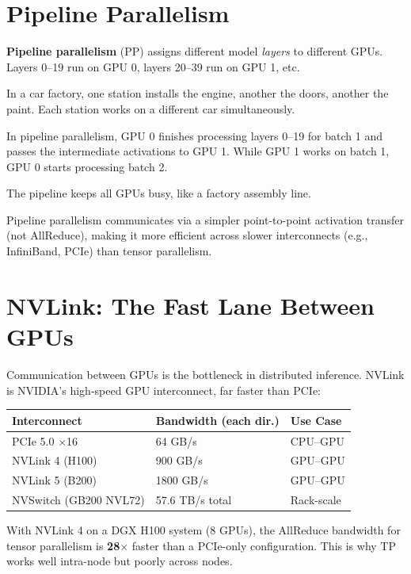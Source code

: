 \documentclass[11pt, twoside, openright]{book}
\newcommand{\analogybox}[2]{\begin{tcolorbox}[analogystyle, title={Analogy: #1}]#2\end{tcolorbox}}
\newcommand{\keyterm}[1]{\textbf{\color{AccentOrange}#1}}
\begin{document}
\section{Pipeline Parallelism}

\keyterm{Pipeline parallelism} (PP) assigns different model \textit{layers} to
different GPUs.  Layers 0--19 run on GPU 0, layers 20--39 run on GPU 1, etc.

\analogybox{The Assembly Line}{
In a car factory, one station installs the engine, another the doors, another the
paint.  Each station works on a different car simultaneously.

In pipeline parallelism, GPU 0 finishes processing layers 0--19 for batch 1 and
passes the intermediate activations to GPU 1.  While GPU 1 works on batch 1,
GPU 0 starts processing batch 2.

The pipeline keeps all GPUs busy, like a factory assembly line.
}

Pipeline parallelism communicates via a simpler point-to-point activation transfer
(not AllReduce), making it more efficient across slower interconnects
(e.g., InfiniBand, PCIe) than tensor parallelism.

\section{NVLink: The Fast Lane Between GPUs}

Communication between GPUs is the bottleneck in distributed inference.  NVLink is
NVIDIA's high-speed GPU interconnect, far faster than PCIe:

\begin{center}
\begin{tabular}{lll}
  \toprule
  \textbf{Interconnect} & \textbf{Bandwidth (each dir.)} & \textbf{Use Case} \\
  \midrule
  PCIe 5.0 $\times$16 & 64 GB/s & CPU--GPU \\
  NVLink 4 (H100) & 900 GB/s & GPU--GPU \\
  NVLink 5 (B200) & 1800 GB/s & GPU--GPU \\
  NVSwitch (GB200 NVL72) & 57.6 TB/s total & Rack-scale \\
  \bottomrule
\end{tabular}
\end{center}

With NVLink 4 on a DGX H100 system (8 GPUs), the AllReduce bandwidth for
tensor parallelism is \textbf{28$\times$} faster than a PCIe-only configuration.
This is why TP works well intra-node but poorly across nodes.
\end{document}
